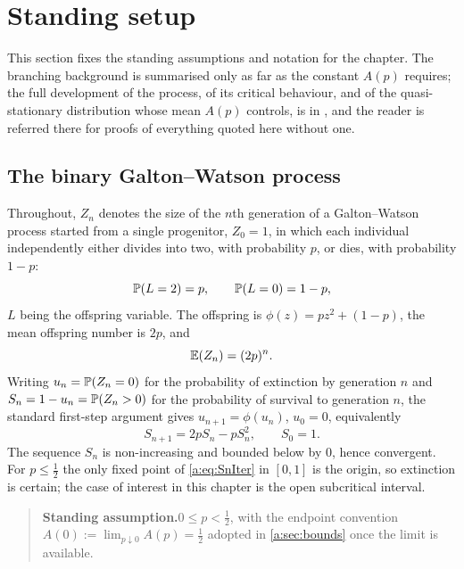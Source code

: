 \section{Standing setup}
\label{a:sec:setup}

This section fixes the standing assumptions and notation for the chapter. The
branching background is summarised only as far as the constant $A(p)$ requires;
the full development of the process, of its critical behaviour, and of the
quasi-stationary distribution whose mean $A(p)$ controls, is in \ChM, and the
reader is referred there for proofs of everything quoted here without one.

\subsection{The binary Galton--Watson process}
\label{a:sec:setupgw}

Throughout, $Z_n$ denotes the size of the $n$th generation of a Galton--Watson
process started from a single progenitor, $Z_0=1$, in which each individual
independently either divides into two, with probability $p$, or dies, with
probability $1-p$:
\begin{equation}
\label{a:eq:binarylaw}
\mathbb{P}\!\left(L=2\right) = p,
\qquad
\mathbb{P}\!\left(L=0\right) = 1-p ,
\end{equation}
$L$ being the offspring variable. The offspring \pgf{} is
$\phi(z) = pz^2+(1-p)$, the mean offspring number is $2p$, and
\begin{equation}
\label{a:eq:meanZn}
\mathbb{E}\!\left(Z_n\right) = (2p)^n .
\end{equation}
Writing $u_n=\mathbb{P}\!\left(Z_n=0\right)$ for the probability of extinction by generation $n$ and
$S_n = 1-u_n = \mathbb{P}\!\left(Z_n>0\right)$ for the probability of survival to generation $n$, the
standard first-step argument \cite{Harris1963,Athreya1972} gives
$u_{n+1}=\phi(u_n)$, $u_0=0$, equivalently
\begin{equation}
\label{a:eq:SnIter}
S_{n+1} = 2pS_n - pS_n^2,
\qquad S_0 = 1 .
\end{equation}
The sequence $S_n$ is non-increasing and bounded below by $0$, hence convergent.
For $p\le\tfrac12$ the only fixed point of \cref{a:eq:SnIter} in $[0,1]$ is the
origin, so extinction is certain; the case of interest in this chapter is the open
subcritical interval.

\begin{quote}
\textbf{Standing assumption.}\quad $0\le p<\tfrac12$, with the endpoint
convention $A(0):=\lim_{p\downarrow0}A(p)=\tfrac12$ adopted in
\cref{a:sec:bounds} once the limit is available.
\end{quote}

